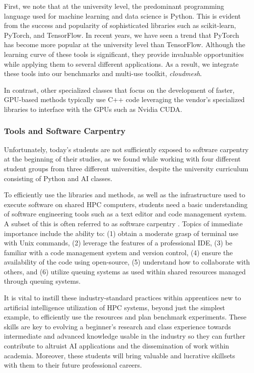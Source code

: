 First, we note that at the university level, the predominant programming language used for machine learning and data science is Python. This is evident from the success and popularity of sophisticated libraries such as scikit-learn, PyTorch, and TensorFlow. In recent years, we have seen a trend that PyTorch has become more popular at the university level than TensorFlow. Although the learning curve of these tools is significant, they provide invaluable opportunities while applying them to several different applications. As a result, we integrate these tools into our benchmarks and multi-use toolkit, {\em cloudmesh}.

In contrast, other specialized classes that focus on the development of faster, GPU-based methods typically use C++ code leveraging the vendor's specialized libraries to interface with the GPUs such as Nvidia CUDA.



\subsubsection{Tools and Software Carpentry}\label{sec:tools}

Unfortunately, today's students are not sufficiently exposed to software carpentry at the beginning of their studies, as we found while working with four different student groups from three different universities, despite the university curriculum consisting of Python and AI classes. 

To efficiently use the libraries and methods, as well as the infrastructure used to execute software on shared HPC computers, students need a basic understanding of software engineering tools such as a text editor and code management system. A subset of this is often referred to as software carpentry \cite{software-carpentry}. Topics of immediate importance include the ability to: (1)
 obtain a moderate grasp of terminal use with Unix commands,
(2) leverage the features of a professional IDE,
(3) be familiar with a code management system and version control,
(4) ensure the availability of the code using open-source, 
(5) understand how to collaborate with others, and (6) utilize queuing systems as used within shared resources managed through queuing systems. 

It is vital to instill these industry-standard practices within apprentices new to artificial intelligence utilization of HPC systems, beyond just the simplest example, to efficiently use the resources and plan benchmark experiments. These skills are key to evolving a beginner's research and class experience towards intermediate and advanced knowledge usable in the industry so they can further contribute to altruist AI applications and the dissemination of work within academia. Moreover, these students will bring valuable and lucrative skillsets with them to their future professional careers.

